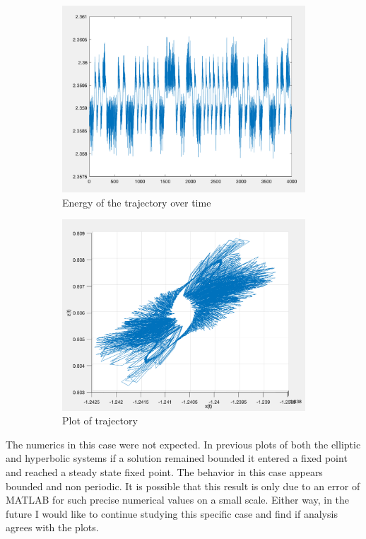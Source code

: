 \documentclass[11pt]{article}
\begin{document}
\begin{figure}[h!]
\centering
\begin{subfigure}{.521\textwidth}
  \centering
  \includegraphics[width=0.9\linewidth]{senergy.png}
  \caption{Energy of the trajectory over time}
  \label{fig:sub1}
\end{subfigure}%
\begin{subfigure}{.5\textwidth}
  \centering
  \includegraphics[width=0.92\linewidth]{splot.png}
  \caption{Plot of trajectory}
  \label{fig:sub2}
\end{subfigure}
\caption{}
\label{fig:une}
\end{figure}

The numerics in this case were not expected. In previous plots of both the elliptic and hyperbolic systems if a solution remained bounded it entered a fixed point and reached a steady state fixed point. The behavior in this case appears bounded and non periodic. It is possible that this result is only due to an error of MATLAB for such precise numerical values on a small scale. Either way, in the future I would like to continue studying this specific case and find if analysis agrees with the plots. 
\end{document}
